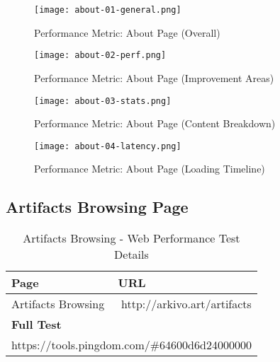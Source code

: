 \begin{figure}[H]
    \centering
    \texttt{[image: about-01-general.png]}
    \caption[Performance Metric: About Page (Overall)]{Performance Metric: About Page (Overall)}
    \label{fig:about-01-general}
\end{figure}

\begin{figure}[H]
    \centering
    \texttt{[image: about-02-perf.png]}
    \caption[Performance Metric: About Page (Improvement Areas)]{Performance Metric: About Page (Improvement Areas)}
    \label{fig:about-02-perf.png}
\end{figure}

\begin{figure}[H]
    \centering
    \texttt{[image: about-03-stats.png]}
    \caption[Performance Metric: About Page (Content Breakdown)]{Performance Metric: About Page (Content Breakdown)}
    \label{fig:about-03-stats.png}
\end{figure}

\begin{figure}[H]
    \centering
    \texttt{[image: about-04-latency.png]}
    \caption[Performance Metric: About Page (Loading Timeline)]{Performance Metric: About Page (Loading Timeline)}
    \label{fig:about-04-latency.png}
\end{figure}


\subsection{Artifacts Browsing Page}


\begin{table}[H]
\footnotesize
\centering
\begin{tabular}{|ll|}
\hline
\multicolumn{1}{|l|}{\textbf{Page}} & \textbf{URL}                                                 \\ \hline
\multicolumn{1}{|l|}{Artifacts Browsing}         & \multicolumn{1}{r|}{http://arkivo.art/artifacts} \\ \hline
\multicolumn{2}{|l|}{\textbf{Full Test}}                                                                    \\ \hline
\multicolumn{2}{|l|}{https://tools.pingdom.com/\#64600d6d24000000}                                 \\ \hline
\end{tabular}
\caption{Artifacts Browsing - Web Performance Test Details}
\label{table:browsing-test-details}
\end{table}



